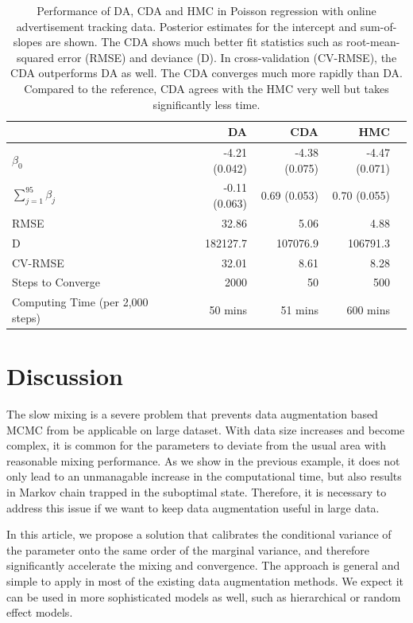 \documentclass[10pt]{article}
\begin{document}
\begin{table}[H]
\centering
\begin{tabular}{|l |r |r| r| r |} 
 \hline
                          & DA & CDA & HMC\\
 [0.5ex]
 \hline
$\beta_0$                         & -4.21 (0.042)& -4.38 (0.075) & -4.47 (0.071) \\
$\sum_{j=1}^{95} \beta_j$         & -0.11 (0.063)& 0.69 (0.053)  & 0.70 (0.055)  \\
RMSE                              & 32.86        & 5.06          & 4.88\\
D                                 & 182127.7     & 107076.9      & 106791.3\\
CV-RMSE                           & 32.01        & 8.61          & 8.28\\
Steps to Converge                 & 2000         & 50            & 500 \\
Computing Time (per 2,000 steps)  & 50 mins       & 51 mins        & 600 mins\\
 \hline
\end{tabular}
\caption{Performance of DA, CDA and HMC in Poisson regression with online advertisement tracking data. Posterior estimates for the intercept and sum-of-slopes are shown. The CDA shows much better fit statistics such as root-mean-squared error (RMSE) and deviance (D). In cross-validation (CV-RMSE), the CDA outperforms DA as well. The CDA converges much more rapidly than DA. Compared to the reference, CDA agrees with the HMC very well but takes significantly less time.}
\label{table:Poisson}
\end{table}


\section{Discussion}

The slow mixing is a severe problem that prevents data augmentation based MCMC from be applicable on large dataset. With data size increases and become complex, it is common for the parameters to deviate from the usual area with reasonable mixing performance. As we show in the previous example, it does not only lead to an unmanagable increase in the computational time, but also results in Markov chain trapped in the suboptimal state.  Therefore, it is necessary to address this issue if we want to keep data augmentation useful in large data.

In this article, we propose a solution that calibrates the conditional variance of the parameter onto the same order of the marginal variance, and therefore significantly accelerate the mixing and convergence. The approach is general and simple to apply in most of the existing data augmentation methods. We expect it can be used in more sophisticated models as well, such as hierarchical or random effect models.
\end{document}
